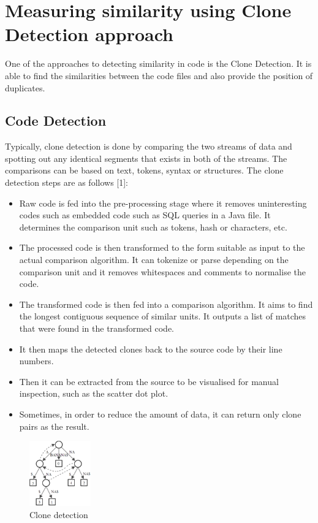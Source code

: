 \section{Measuring similarity using Clone Detection approach}
One of the approaches to detecting similarity in code is the Clone Detection. It is able to find the similarities between the code files and also provide the position of duplicates.

\subsection{Code Detection}
Typically, clone detection is done by comparing the two streams of data and spotting out any identical segments that exists in both of the streams. The comparisons can be based on text, tokens, syntax or structures.
The clone detection steps are as follows [1]:
\begin{itemize}
\item Raw code is fed into the pre-processing stage where it removes uninteresting codes such as embedded code such as SQL queries in a Java file. It determines the comparison unit such as tokens, hash or characters, etc.
\item The processed code is then transformed to the form suitable as input to the actual comparison algorithm. It can tokenize or parse depending on the comparison unit and it removes whitespaces and comments to normalise the code.
\item The transformed code is then fed into a comparison algorithm. It aims to find the longest contiguous sequence of similar units. It outputs a list of matches that were found in the transformed code.
\item It then maps the detected clones back to the source code by their line numbers.
\item Then it can be extracted from the source to be visualised for manual inspection, such as the scatter dot plot.
\item Sometimes, in order to reduce the amount of data, it can return only clone pairs as the result. 
\end{itemize}
\begin{figure} [ht]
\centering
\includegraphics{Figures/clonedetection}
\caption{Clone detection}
\label{fig:sample}
\end{figure}
